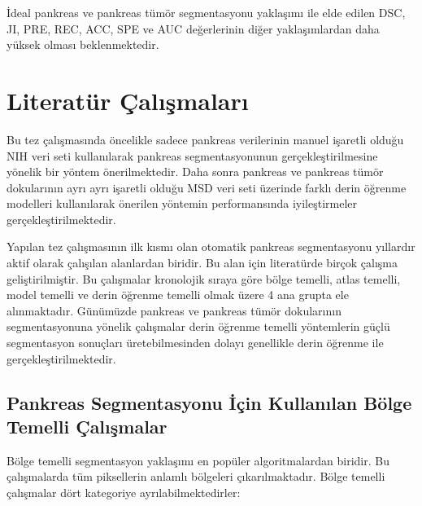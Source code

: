 İdeal pankreas ve pankreas tümör segmentasyonu yaklaşımı ile elde edilen DSC, JI, PRE, REC, ACC, SPE ve AUC değerlerinin diğer yaklaşımlardan daha yüksek olması beklenmektedir.

\section{Literatür Çalışmaları}

Bu tez çalışmasında öncelikle sadece pankreas verilerinin manuel işaretli olduğu NIH veri seti kullanılarak pankreas segmentasyonunun gerçekleştirilmesine yönelik bir yöntem önerilmektedir. Daha sonra pankreas ve pankreas tümör dokularının ayrı ayrı işaretli olduğu MSD veri seti üzerinde farklı derin öğrenme modelleri kullanılarak önerilen yöntemin performansında iyileştirmeler gerçekleştirilmektedir.

Yapılan tez çalışmasının ilk kısmı olan otomatik pankreas segmentasyonu yıllardır aktif olarak çalışılan alanlardan biridir. Bu alan için literatürde birçok çalışma geliştirilmiştir. Bu çalışmalar kronolojik sıraya göre bölge temelli, atlas temelli, model temelli ve derin öğrenme temelli olmak üzere 4 ana grupta ele alınmaktadır. Günümüzde pankreas ve pankreas tümör dokularının segmentasyonuna yönelik çalışmalar derin öğrenme temelli yöntemlerin güçlü segmentasyon sonuçları üretebilmesinden dolayı genellikle derin öğrenme ile gerçekleştirilmektedir.

\subsection{Pankreas Segmentasyonu İçin Kullanılan Bölge Temelli Çalışmalar}

Bölge temelli segmentasyon yaklaşımı en popüler algoritmalardan biridir. Bu çalışmalarda tüm piksellerin anlamlı bölgeleri çıkarılmaktadır. Bölge temelli çalışmalar dört kategoriye ayrılabilmektedirler: 

